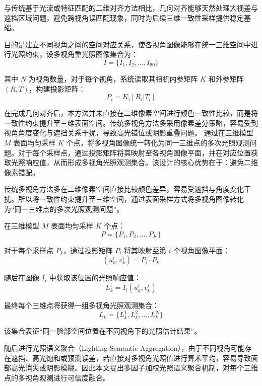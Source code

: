 与传统基于光流或特征匹配的二维对齐方法相比，几何对齐能够天然处理大视差与遮挡区域问题，避免跨视角误匹配现象，同时为后续三维一致性采样提供稳定基础。

目的是建立不同视角之间的空间对应关系，使各视角图像能够在统一三维空间中进行光照约束，设多视角重光照图像集合为：
\begin{equation}
I = \{I_1, I_2, \dots, I_{90}\}
\end{equation}

其中 \(N\) 为视角数量，对于每个视角，系统读取其相机内参矩阵 \(K\) 和外参矩阵 \((R, T)\)，构建投影矩阵：
\begin{equation}
P_i = K_i [R_i | T_i]
\end{equation}

在完成几何对齐后，本方法并未直接在二维像素空间进行颜色一致性比较，而是将一致性约束提升至三维表面空间。传统多视角方法多采用像素差分策略，容易受到视角角度变化与遮挡关系干扰，导致高光错位或阴影重叠问题。
通过在三维模型 \(M\) 表面均匀采样 \(K\) 个点，将多视角图像统一转化为同一三维点的多次光照观测问题。对于每个采样点，通过投影矩阵将其映射至各视角图像平面，并在对应位置获取光照响应值，从而形成多视角光照观测集合。该设计的核心优势在于：避免二维像素错配。


传统多视角方法多在二维像素空间直接比较颜色差异，容易受遮挡与角度变化干扰。所以将一致性约束提升至三维空间，通过表面采样方式将多视角图像转化为“同一三维点的多次光照观测问题”。

在三维模型 \(M\) 表面均匀采样 \(K\) 个点：
\begin{equation}
P = \{P_1, P_2, \dots, P_K\}
\end{equation}

对于每个采样点 \(P_k\)，通过投影矩阵 \(P_i\) 将其映射至第 \(i\) 个视角图像平面：
\begin{equation}
(u_k^i, v_k^i) = P_i \cdot P_k
\end{equation}

随后在图像 \(I_i\) 中获取该位置的光照响应值：
\begin{equation}
L_k^i = I_i(u_k^i, v_k^i)
\end{equation}

最终每个三维点将获得一组多视角光照观测集合：
\begin{equation}
L_k = \{L_k^1, L_k^2, \dots, L_k^N\}
\end{equation}

该集合表征“同一脸部空间位置在不同视角下的光照估计结果”。

随后进行光照语义聚合（Lighting Semantic Aggregation），由于不同视角可能存在遮挡、高光饱和或预测误差，若直接对多视角光照值进行算术平均，容易导致面部高光消失或阴影模糊。因此本文提出多因子加权光照语义聚合机制，对每个三维点的多视角观测进行可信度融合。


